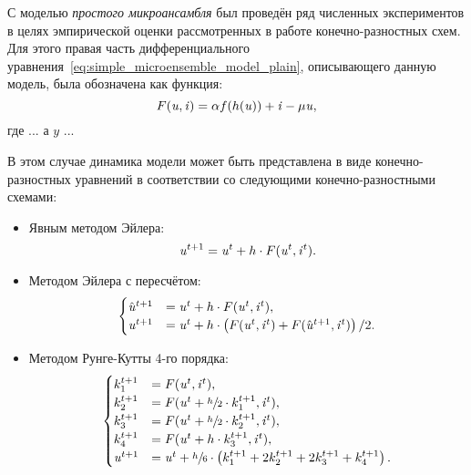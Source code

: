 С моделью \textit{простого микроансамбля} был проведён ряд численных экспериментов в целях эмпирической оценки рассмотренных в работе конечно-разностных схем. Для этого правая часть дифференциального уравнения~\eqref{eq:simple_microensemble_model_plain}, описывающего данную модель, была обозначена как функция:
\begin{equation}
    \nonumber
    F(\mathit{u}, \mathit{i}) = \alpha f(h(\mathit{u})) + \mathit{i} - \mu \mathit{u},
\end{equation}
где ... а $y$ ...

В этом случае динамика модели может быть представлена в виде конечно-разностных уравнений в соответствии со следующими конечно-разностными схемами:
\begin{itemize}
    \item Явным методом Эйлера:
        \begin{equation}
            \nonumber
            \mathit{u}^{t+1} = \mathit{u}^{t} + h \cdot F(\mathit{u}^{t}, \mathit{i}^{t}).
        \end{equation}
    \item Методом Эйлера с пересчётом:
        \begin{equation}
            \nonumber
            \begin{cases}
                \hat{\mathit{u}}^{t+1}  &= \mathit{u}^{t} + h \cdot F(\mathit{u}^{t}, \mathit{i}^{t}), \\ 
                \mathit{u}^{t+1}        &= \mathit{u}^{t} + h \cdot \left( F(\mathit{u}^{t}, \mathit{i}^{t}) + F(\hat{\mathit{u}}^{t+1}, \mathit{i}^{t}) \right) / 2.
            \end{cases}
        \end{equation}
    \item Методом Рунге-Кутты 4-го порядка:
        \begin{equation}
            \nonumber
            \begin{cases}
                k_{1}^{t+1} &= F(\mathit{u}^{t}, \mathit{i}^{t}), \\ 
                k_{2}^{t+1} &= F(\mathit{u}^{t} + \sfrac{h}{2} \cdot k_{1}^{t+1}, \mathit{i}^{t}), \\
                k_{3}^{t+1} &= F(\mathit{u}^{t} + \sfrac{h}{2} \cdot k_{2}^{t+1}, \mathit{i}^{t}), \\
                k_{4}^{t+1} &= F(\mathit{u}^{t} + h \cdot k_{3}^{t+1}, \mathit{i}^{t}), \\
                \mathit{u}^{t+1} &= \mathit{u}^{t} + \sfrac{h}{6} \cdot \left( k_{1}^{t+1} + 2 k_{2}^{t+1} + 2 k_{3}^{t+1} + k_{4}^{t+1} \right).
            \end{cases}
        \end{equation}
\end{itemize}

